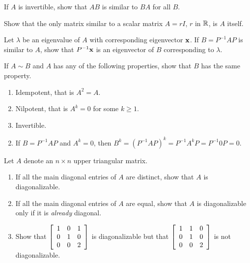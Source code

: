 \begin{multicols}{2}
\begin{ex}
If $A$ is invertible, show that $AB$ is similar to $BA$ for all $B$.
\end{ex}

\begin{ex}
Show that the only matrix similar to a scalar matrix $A = rI$, $r$ in $\mathbb{R}$, is $A$ itself.
\end{ex}

\begin{ex}
Let $\lambda$ be an eigenvalue of $A$ with corresponding eigenvector $\textbf{x}$. If $B = P^{-1}AP$ is similar to $A$, show that $P^{-1}\textbf{x}$ is an eigenvector of $B$ corresponding to $\lambda$.
\end{ex}

\begin{ex}
If $A \sim B$ and $A$ has any of the following properties, show that $B$ has the same property.

\begin{enumerate}[label={\alph*.}]
\item Idempotent, that is $A^{2} = A$.

\item Nilpotent, that is $A^{k} = 0$ for some $k \geq 1$.

\item Invertible.

\end{enumerate}
\begin{sol}
\begin{enumerate}[label={\alph*.}]
\setcounter{enumi}{1}
\item  If $B = P^{-1}AP$ and $A^{k} = 0$, then $B^{k} = (P^{-1}AP)^{k} = P^{-1}A^{k}P = P^{-1}0P = 0$.

\end{enumerate}
\end{sol}
\end{ex}

\begin{ex}
Let $A$ denote an $n \times n$ upper triangular matrix.

\begin{enumerate}[label={\alph*.}]
\item If all the main diagonal entries of $A$ are distinct, show that $A$ is diagonalizable.

\item If all the main diagonal entries of $A$ are equal, show that $A$ is diagonalizable only if it is \textit{already} diagonal.

\item Show that $\left[ \begin{array}{rrr}
1 & 0 & 1 \\
0 & 1 & 0 \\
0 & 0 & 2
\end{array} \right]$ is diagonalizable but that $
 \left[ \begin{array}{rrr}
 1 & 1 & 0 \\
 0 & 1 & 0 \\
 0 & 0 & 2
 \end{array} \right]$ is not diagonalizable.


\end{enumerate}
\end{ex}
\end{multicols}
